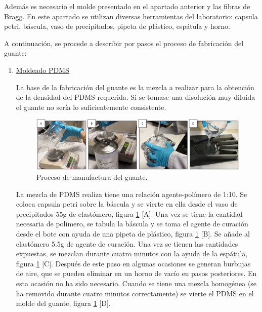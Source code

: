\begin{itemize}
	

	Además es necesario el molde presentado en el apartado anterior y las fibras de Bragg. En este apartado se utilizan diversas herramientas del laboratorio: capsula petri, báscula, vaso de precipitados, pipeta de plástico, espátula y  horno. 
	

	A continuación, se procede a describir por pasos el proceso de fabricación del guante:
	\begin{enumerate}
		\item \underline{Moldeado PDMS}
		
		La base de la fabricación del guante es la mezcla a realizar para la obtención de la densidad del PDMS requerida. Si se tomase una disolución muy diluida el guante no sería lo suficientemente consistente. 
		
		
		
		\begin{figure}[H]
			\centering
			\includegraphics[width=1\textwidth]{./img/fabricacionGuante}
			\caption{Proceso de manufactura del guante.} \label{fig:fabricacionGuante}
		\end{figure}
		
		La mezcla de PDMS realiza tiene una relación agente-polímero de 1:10. Se coloca capsula petri sobre la báscula y se vierte en ella desde el vaso de precipitados 55g de elastómero, figura \ref{fig:fabricacionGuante}  [A]. Una vez se tiene la cantidad necesaria de polímero, se tabula la báscula y se toma el agente de curación desde el bote con ayuda de una pipeta de plástico, figura \ref{fig:fabricacionGuante} [B]. Se añade al elastómero 5.5g de agente de curación. Una vez se tienen las cantidades expuestas, se mezclan durante cuatro minutos con la ayuda de la espátula, figura \ref{fig:fabricacionGuante} [C]. Después de este paso en algunas ocasiones se generan burbujas de aire, que se pueden eliminar en un horno de vacío en pasos posteriores. En esta ocasión no ha sido necesario. Cuando se tiene una mezcla homogénea (se ha removido durante cuatro minutos correctamente) se vierte el PDMS en el molde del guante, figura \ref{fig:fabricacionGuante} [D].  	
		
		
		


\end{enumerate}
\end{itemize}
